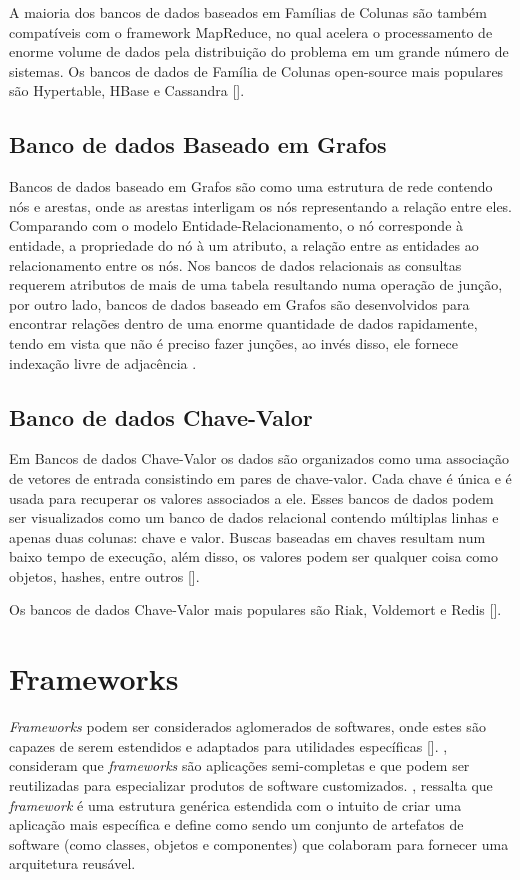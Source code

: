A maioria dos bancos de dados baseados em Famílias de Colunas são também compatíveis com o framework MapReduce, no qual acelera o processamento de enorme volume de dados pela distribuição do problema em um grande número de sistemas. Os bancos de dados  de Família de Colunas open-source mais populares são Hypertable, HBase e Cassandra [\cite{kaur:2013}].

\subsection{Banco de dados Baseado em Grafos}

Bancos de dados baseado em Grafos são como uma estrutura de rede contendo nós e arestas, onde as arestas interligam os nós representando a relação entre eles. Comparando com o modelo Entidade-Relacionamento, o nó corresponde à entidade, a propriedade do nó à um atributo, a relação entre as entidades ao relacionamento entre os nós. Nos bancos de dados relacionais as consultas requerem atributos de mais de uma tabela resultando numa operação de junção, por outro lado, bancos de dados baseado em Grafos são desenvolvidos para encontrar relações dentro de uma enorme quantidade de dados rapidamente, tendo em vista que não é preciso fazer junções, ao invés disso, ele fornece indexação livre de adjacência \cite{kaur:2013}.

\subsection{Banco de dados Chave-Valor}

Em Bancos de dados Chave-Valor os dados são organizados como uma associação de vetores de entrada consistindo em pares de chave-valor. Cada chave é única e é usada para recuperar os valores associados a ele. Esses bancos de dados podem ser visualizados como um banco de dados relacional contendo múltiplas linhas e apenas duas colunas: chave e valor. Buscas baseadas em chaves resultam num baixo tempo de execução, além disso, os valores podem ser qualquer coisa como objetos, hashes, entre outros [\cite{kaur:2013}].

Os bancos de dados Chave-Valor mais populares são Riak, Voldemort e Redis [\cite{kaur:2013}].


\section{Frameworks}

\textit{Frameworks} podem ser considerados aglomerados de softwares, onde estes são capazes de serem estendidos e adaptados para utilidades específicas [\cite{taligent:1994}]. \cite{pree:1997}, consideram que  \textit{frameworks} são aplicações semi-completas e que podem ser reutilizadas para especializar produtos de software customizados. \cite{sommerville:2013}, ressalta que \textit{framework} é uma estrutura genérica estendida com o intuito de criar uma aplicação mais específica e \cite{schmidt:2004} define como sendo um conjunto de artefatos de software (como classes, objetos e componentes) que colaboram para fornecer uma arquitetura reusável.

